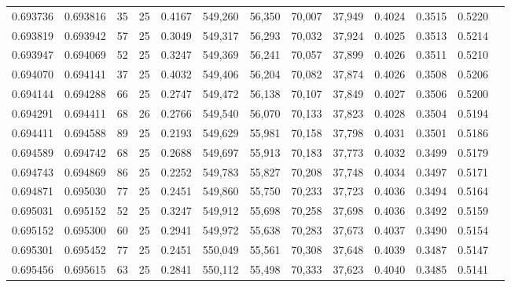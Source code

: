 \begin{tabular}{rrrrrrrrrrrrr}
0.693736 & 0.693816 &    35 &  25 &                                     0.4167 & 549,260 &  56,350 &  70,007 &  37,949 & 0.4024 & 0.3515 & 0.5220 \\
0.693819 & 0.693942 &    57 &  25 &                                     0.3049 & 549,317 &  56,293 &  70,032 &  37,924 & 0.4025 & 0.3513 & 0.5214 \\
0.693947 & 0.694069 &    52 &  25 &                                     0.3247 & 549,369 &  56,241 &  70,057 &  37,899 & 0.4026 & 0.3511 & 0.5210 \\
0.694070 & 0.694141 &    37 &  25 &                                     0.4032 & 549,406 &  56,204 &  70,082 &  37,874 & 0.4026 & 0.3508 & 0.5206 \\
0.694144 & 0.694288 &    66 &  25 &                                     0.2747 & 549,472 &  56,138 &  70,107 &  37,849 & 0.4027 & 0.3506 & 0.5200 \\
0.694291 & 0.694411 &    68 &  26 &                                     0.2766 & 549,540 &  56,070 &  70,133 &  37,823 & 0.4028 & 0.3504 & 0.5194 \\
0.694411 & 0.694588 &    89 &  25 &                                     0.2193 & 549,629 &  55,981 &  70,158 &  37,798 & 0.4031 & 0.3501 & 0.5186 \\
0.694589 & 0.694742 &    68 &  25 &                                     0.2688 & 549,697 &  55,913 &  70,183 &  37,773 & 0.4032 & 0.3499 & 0.5179 \\
0.694743 & 0.694869 &    86 &  25 &                                     0.2252 & 549,783 &  55,827 &  70,208 &  37,748 & 0.4034 & 0.3497 & 0.5171 \\
0.694871 & 0.695030 &    77 &  25 &                                     0.2451 & 549,860 &  55,750 &  70,233 &  37,723 & 0.4036 & 0.3494 & 0.5164 \\
0.695031 & 0.695152 &    52 &  25 &                                     0.3247 & 549,912 &  55,698 &  70,258 &  37,698 & 0.4036 & 0.3492 & 0.5159 \\
0.695152 & 0.695300 &    60 &  25 &                                     0.2941 & 549,972 &  55,638 &  70,283 &  37,673 & 0.4037 & 0.3490 & 0.5154 \\
0.695301 & 0.695452 &    77 &  25 &                                     0.2451 & 550,049 &  55,561 &  70,308 &  37,648 & 0.4039 & 0.3487 & 0.5147 \\
0.695456 & 0.695615 &    63 &  25 &                                     0.2841 & 550,112 &  55,498 &  70,333 &  37,623 & 0.4040 & 0.3485 & 0.5141 \\

\end{tabular}
